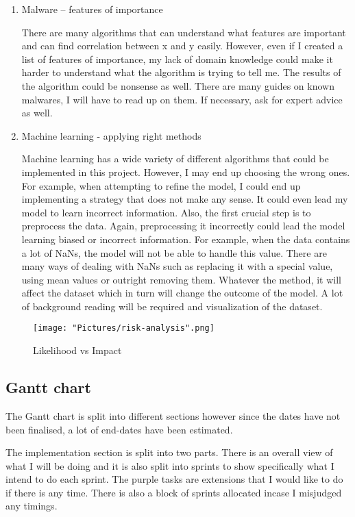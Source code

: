 \documentclass[11pt]{article}
\begin{document}
\begin{enumerate}
\begin{enumerate}
    \item{Malware – features of importance}

    There are many algorithms that can understand what features are important and can find correlation between x and y easily. However, even if I created a list of features of importance, my lack of domain knowledge could make it harder to understand what the algorithm is trying to tell me. The results of the algorithm could be nonsense as well. There are many guides on known malwares, I will have to read up on them. If necessary, ask for expert advice as well.
  
    \item{Machine learning - applying right methods}

    Machine learning has a wide variety of different algorithms that could be implemented in this project. However, I may end up choosing the wrong ones. For example, when attempting to refine the model, I could end up implementing a strategy that does not make any sense. It could even lead my model to learn incorrect information.
Also, the first crucial step is to preprocess the data. Again, preprocessing it incorrectly could lead the model learning biased or incorrect information. For example, when the data contains a lot of NaNs, the model will not be able to handle this value. There are many ways of dealing with NaNs such as replacing it with a special value, using mean values or outright removing them. Whatever the method, it will affect the dataset which in turn will change the outcome of the model. A lot of background reading will be required and visualization of the dataset.
  \end{enumerate}
\end{enumerate}

\begin{figure}[h!]
   \texttt{[image: "Pictures/risk-analysis".png]}
   \caption{Likelihood vs Impact}
   \label{fig:risk-analysis}
\end{figure}


\subsection{Gantt chart}
The Gantt chart is split into different sections however since the dates have not been finalised, a lot of end-dates have been estimated. 

The implementation section is split into two parts. There is an overall view of what I will be doing and it is also split into sprints to show specifically what I intend to do each sprint. The purple tasks are extensions that I would like to do if there is any time. There is also a block of sprints allocated incase I misjudged any timings.
\end{document}
